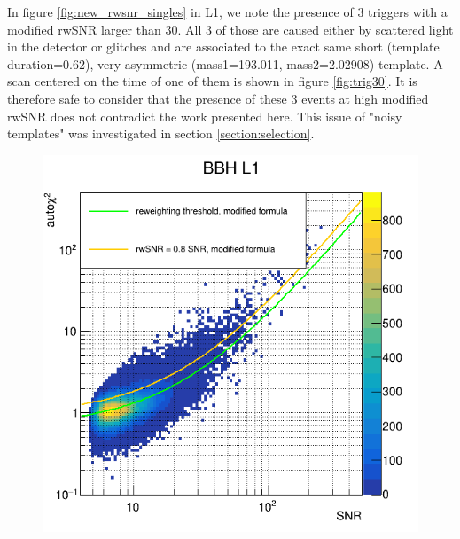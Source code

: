 In figure \ref{fig:new_rwsnr_singles} in L1, we note the presence of 3 triggers with a modified rwSNR larger than 30.
All 3 of those are caused either by scattered light in the detector or glitches and are associated to the exact same short (template duration=0.62), very asymmetric (mass1=193.011, mass2=2.02908) template.
A scan centered on the time of one of them is shown in figure \ref{fig:trig30}.
It is therefore safe to consider that the presence of these 3 events at high modified rwSNR does not contradict the work presented here.
This issue of "noisy templates" was investigated in section \ref{section:selection}.







\begin{figure}
  \centering
  \begin{minipage}{0.45\linewidth}
    \centering
    \includegraphics[width=\linewidth]{sectionImprovement/rwSNR/cSnrAchi2_new_L1_a12.png}
  \end{minipage}

\end{figure}
